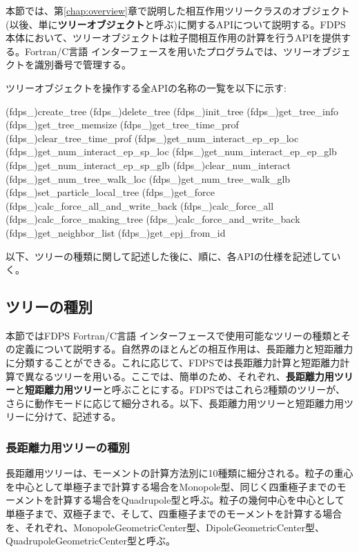 \newcommand{\tlap}[1]{\vbox to 0pt{\vss\hbox{#1}}}
\newcommand{\blap}[1]{\vbox to 0pt{\hbox{#1}\vss}}

本節では、第\ref{chap:overview}章で説明した相互作用ツリークラスのオブジェクト(以後、単に\textbf{ツリーオブジェクト}と呼ぶ)に関するAPIについて説明する。FDPS本体において、ツリーオブジェクトは粒子間相互作用の計算を行うAPIを提供する。Fortran/C言語 インターフェースを用いたプログラムでは、ツリーオブジェクトを識別番号で管理する。

ツリーオブジェクトを操作する全APIの名称の一覧を以下に示す:
\begin{screen}
\begin{spverbatim}
(fdps_)create_tree
(fdps_)delete_tree
(fdps_)init_tree
(fdps_)get_tree_info
(fdps_)get_tree_memsize
(fdps_)get_tree_time_prof
(fdps_)clear_tree_time_prof
(fdps_)get_num_interact_ep_ep_loc
(fdps_)get_num_interact_ep_sp_loc
(fdps_)get_num_interact_ep_ep_glb
(fdps_)get_num_interact_ep_sp_glb
(fdps_)clear_num_interact
(fdps_)get_num_tree_walk_loc
(fdps_)get_num_tree_walk_glb
(fdps_)set_particle_local_tree
(fdps_)get_force
(fdps_)calc_force_all_and_write_back
(fdps_)calc_force_all
(fdps_)calc_force_making_tree
(fdps_)calc_force_and_write_back
(fdps_)get_neighbor_list
(fdps_)get_epj_from_id
\end{spverbatim}  
\end{screen}

以下、ツリーの種類に関して記述した後に、順に、各APIの仕様を記述していく。
\clearpage

\subsection{ツリーの種別}
本節ではFDPS Fortran/C言語 インターフェースで使用可能なツリーの種類とその定義について説明する。自然界のほとんどの相互作用は、長距離力と短距離力に分類することができる。これに応じて、FDPSでは長距離力計算と短距離力計算で異なるツリーを用いる。ここでは、簡単のため、それぞれ、\textbf{長距離力用ツリー}と\textbf{短距離力用ツリー}と呼ぶことにする。FDPSではこれら2種類のツリーが、さらに動作モードに応じて細分される。以下、長距離力用ツリーと短距離力用ツリーに分けて、記述する。

\subsubsection{長距離力用ツリーの種別}
\label{subsubsec:tree_kinds_long}
長距離用ツリーは、モーメントの計算方法別に10種類に細分される。粒子の重心を中心として単極子まで計算する場合をMonopole型、同じく四重極子までのモーメントを計算する場合をQuadrupole型と呼ぶ。粒子の幾何中心を中心として単極子まで、双極子まで、そして、四重極子までのモーメントを計算する場合を、それぞれ、MonopoleGeometricCenter型、DipoleGeometricCenter型、QuadrupoleGeometricCenter型と呼ぶ。

